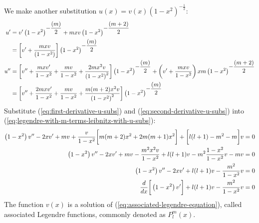 \begin{enumerate}
\begin{align}
    \end{align}
    We make another substitution $\displaystyle u(x)=v(x)\left(1-x^2\right)^{\displaystyle-\frac{1}{2}}$:
    \begin{align}
        u^{\prime}&=v^{\prime}\left(1-x^2\right)^{\displaystyle-\frac{(m)}{2}}+mxv\left(1-x^2\right)^{\displaystyle-\frac{(m+2)}{2}}\notag\\
        &=\bigg[v^{\prime}+\frac{mxv}{\left(1-x^2\right)}\bigg]\left(1-x^2\right)^{\displaystyle-\frac{(m)}{2}}\label{eq:first-derivative-u-subs}\\
        u^{\prime\prime}&=\bigg[v^{\prime\prime}+\frac{mxv^{\prime}}{1-x^2}+\frac{mv}{1-x^2}+\frac{2mx^2v}{\left(1-x^2\right)^2}\bigg]\left(1-x^2\right)^{\displaystyle-\frac{(m)}{2}}+\left(v^{\prime}+\frac{mxv}{1-x^2}\right)xm\left(1-x^2\right)^{\displaystyle-\frac{(m+2)}{2}}\notag\\
        &=\bigg[v^{\prime\prime}+\frac{2mxv^{\prime}}{1-x^2}+\frac{mv}{1-x^2}+\frac{m(m+2)x^2v}{\left(1-x^2\right)^2}\bigg]\left(1-x^2\right)^{\displaystyle-\frac{(m)}{2}}\label{eq:second-derivative-u-subs}
    \end{align}
    Substitute (\ref{eq:first-derivative-u-subs}) and (\ref{eq:second-derivative-u-subs}) into (\ref{eq;legendre-with-m-terms-leibnitz-with-u-subs}):
    \begin{align}
        \left(1-x^2\right)v^{\prime\prime}-2xv^{\prime}+mv+\frac{v}{1-x^2}\bigg[m(m+2)x^2+2m(m+1)x^2\bigg]+\bigg[l(l+1)-m^2-m\bigg]v&=0\notag\\
        \left(1-x^2\right)v^{\prime\prime}-2xv^{\prime}+mv-\frac{m^2x^2v}{1-x^2}+l(l+1)v-m^2\frac{1-x^2}{1-x^2}v-mv&=0\notag\\
        \left(1-x^2\right)v^{\prime\prime}-2xv^{\prime}+l(l+1)v-\frac{m^2}{1-x^2}v&=0\notag\\
        \frac{d}{dx}\bigg[\left(1-x^2\right)v^{\prime}\bigg]+l(l+1)v-\frac{m^2}{1-x^2}v&=0
    \end{align}
    The function $v(x)$ is a solution of (\ref{eq:associated-legendre-equation}), called associated Legendre functions, commonly denoted as $P_l^m(x)$.


\end{enumerate}
